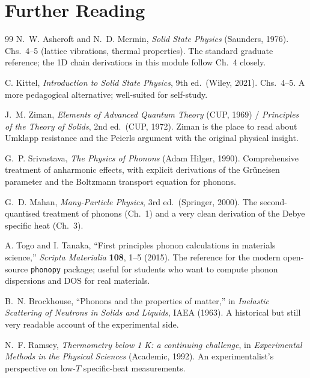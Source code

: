 \documentclass[11pt,a4paper]{article}
\begin{document}
\section*{Further Reading}

\begin{thebibliography}{99}
 N.~W. Ashcroft and N.~D. Mermin,
  \emph{Solid State Physics} (Saunders, 1976).
  Chs.~4--5 (lattice vibrations, thermal properties). The standard graduate
  reference; the 1D chain derivations in this module follow Ch.~4 closely.

 C. Kittel,
  \emph{Introduction to Solid State Physics}, 9th ed.\ (Wiley, 2021).
  Chs.~4--5. A more pedagogical alternative; well-suited for self-study.

 J.~M. Ziman,
  \emph{Elements of Advanced Quantum Theory} (CUP, 1969) /
  \emph{Principles of the Theory of Solids}, 2nd ed.\ (CUP, 1972).
  Ziman is the place to read about Umklapp resistance and the Peierls argument
  with the original physical insight.

 G.~P. Srivastava,
  \emph{The Physics of Phonons} (Adam Hilger, 1990).
  Comprehensive treatment of anharmonic effects, with explicit derivations of
  the Gr\"uneisen parameter and the Boltzmann transport equation for phonons.

 G.~D. Mahan,
  \emph{Many-Particle Physics}, 3rd ed.\ (Springer, 2000).
  The second-quantised treatment of phonons (Ch.~1) and a very clean derivation
  of the Debye specific heat (Ch.~3).

 A. Togo and I. Tanaka,
  ``First principles phonon calculations in materials science,''
  \emph{Scripta Materialia} \textbf{108}, 1--5 (2015).
  The reference for the modern open-source \texttt{phonopy} package; useful for
  students who want to compute phonon dispersions and DOS for real materials.

 B.~N. Brockhouse,
  ``Phonons and the properties of matter,''
  in \emph{Inelastic Scattering of Neutrons in Solids and Liquids}, IAEA (1963).
  A historical but still very readable account of the experimental side.

 N.~F. Ramsey,
  \emph{Thermometry below 1 K: a continuing challenge},
  in \emph{Experimental Methods in the Physical Sciences} (Academic, 1992).
  An experimentalist's perspective on low-$T$ specific-heat measurements.
\end{thebibliography}
\end{document}
